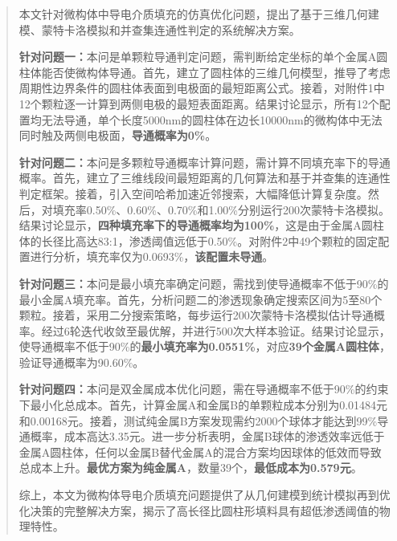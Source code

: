 
\begin{abstract}
本文针对微构体中导电介质填充的仿真优化问题，提出了基于三维几何建模、蒙特卡洛模拟和并查集连通性判定的系统解决方案。

\textbf{针对问题一：}本问是单颗粒导通判定问题，需判断给定坐标的单个金属A圆柱体能否使微构体导通。首先，建立了圆柱体的三维几何模型，推导了考虑周期性边界条件的圆柱体表面到电极面的最短距离公式。接着，对附件1中12个颗粒逐一计算到两侧电极的最短表面距离。结果讨论显示，所有12个配置均无法导通，单个长度5000nm的圆柱体在边长10000nm的微构体中无法同时触及两侧电极面，\textbf{导通概率为0\%}。

\textbf{针对问题二：}本问是多颗粒导通概率计算问题，需计算不同填充率下的导通概率。首先，建立了三维线段间最短距离的几何算法和基于并查集的连通性判定框架。接着，引入空间哈希加速近邻搜索，大幅降低计算复杂度。然后，对填充率0.50\%、0.60\%、0.70\%和1.00\%分别运行200次蒙特卡洛模拟。结果讨论显示，\textbf{四种填充率下的导通概率均为100\%}，这是由于金属A圆柱体的长径比高达83:1，渗透阈值远低于0.50\%。对附件2中49个颗粒的固定配置进行分析，填充率仅为0.0693\%，\textbf{该配置未导通}。

\textbf{针对问题三：}本问是最小填充率确定问题，需找到使导通概率不低于90\%的最小金属A填充率。首先，分析问题二的渗透现象确定搜索区间为5至80个颗粒。接着，采用二分搜索策略，每步运行200次蒙特卡洛模拟估计导通概率。经过6轮迭代收敛至最优解，并进行500次大样本验证。结果讨论显示，使导通概率不低于90\%的\textbf{最小填充率为0.0551\%}，对应\textbf{39个金属A圆柱体}，验证导通概率为90.60\%。

\textbf{针对问题四：}本问是双金属成本优化问题，需在导通概率不低于90\%的约束下最小化总成本。首先，计算金属A和金属B的单颗粒成本分别为0.01484元和0.00168元。接着，测试纯金属B方案发现需约2000个球体才能达到99\%导通概率，成本高达3.35元。进一步分析表明，金属B球体的渗透效率远低于金属A圆柱体，任何以金属B替代金属A的混合方案均因球体的低效而导致总成本上升。\textbf{最优方案为纯金属A}，数量39个，\textbf{最低成本为0.579元}。

综上，本文为微构体导电介质填充问题提供了从几何建模到统计模拟再到优化决策的完整解决方案，揭示了高长径比圆柱形填料具有超低渗透阈值的物理特性。

\label{abstract:end}
\end{abstract}
